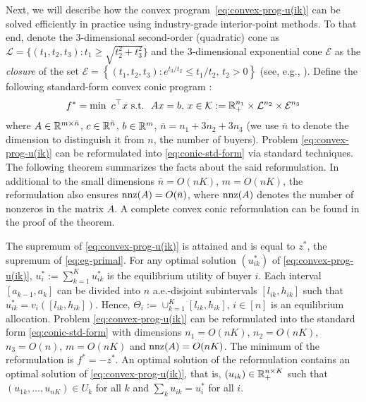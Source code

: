 Next, we will describe how the convex program~\ref{eq:convex-prog-u(ik)} can be solved efficiently in practice using industry-grade interior-point methods.
To that end, denote the $3$-dimensional second-order (quadratic) cone as $\mathcal{L} = \{ (t_1, t_2, t_3): t_1 \geq \sqrt{t_2^2+t_3^2} \}$ and the $3$-dimensional exponential cone $\mathcal{E}$ as the \textit{closure} of the set $\mathcal{E}  = \left\{ (t_1, t_2, t_3): e^{t_3/t_2} \leq t_1/t_2,\, t_2 >0 \right\}$ (see, e.g., \cite{chares2009cones}).
Define the following standard-form convex conic program \citep{skajaa2015homogeneous,dahl2019primal,nemirovski2004interior}:
\begin{align}
	\begin{split}
		f^* = \min\ c^\top x \ {\rm s.t.}\  \ Ax = b,\,  x\in \mathcal{K}:= \mathbb{R}_+^{n_1} \times \mathcal{L}^{n_2} \times \mathcal{E}^{n_3}
	\end{split} \label{eq:conic-std-form}
\end{align}
where $A\in \mathbb{R}^{m\times \bar{n}}$, $c\in \mathbb{R}^{\bar{n}}$, $b\in \mathbb{R}^m$, $\bar{n} = n_1 + 3n_2 + 3n_3$ (we use $\bar{n}$ to denote the dimension to distinguish it from $n$, the number of buyers). 
Problem \eqref{eq:convex-prog-u(ik)} can be reformulated into \eqref{eq:conic-std-form} via standard techniques. 
The following theorem summarizes the facts about the said reformulation. 
In additional to the small dimensions $\bar{n} = O(nK)$, $m=O(nK)$, the reformulation also ensures ${\rm nnz}(A) = O(\bar{n})$, where ${\rm nnz}(A)$ denotes the number of nonzeros in the matrix $A$. A complete convex conic reformulation can be found in the proof of the theorem.
\begin{theorem}
	The supremum of \eqref{eq:convex-prog-u(ik)} is attained and is equal to $z^*$, the supremum of \eqref{eq:eg-primal}.
	For any optimal solution $(u^*_{ik})$ of \eqref{eq:convex-prog-u(ik)}, $u^*_i := \sum_{k=1}^K u^*_{ik}$ is the equilibrium utility of buyer $i$. 
	Each interval $[a_{k-1}, a_k]$ can be divided into $n$ a.e.-disjoint subintervals $[l_{ik}, h_{ik}]$ such that $u^*_{ik} = v_i([l_{ik}, h_{ik}])$. Hence, $\Theta_i := \cup_{k=1}^K [l_{ik}, h_{ik}]$, $i\in[n]$ is an equilibrium allocation. 
	Problem \eqref{eq:convex-prog-u(ik)} can be reformulated into the standard form \eqref{eq:conic-std-form} with dimensions $n_1 = O(nK)$, $n_2 = O(nK)$, $n_3 = O(n)$, $m = O(nK)$ and ${\rm nnz}(A) = O(nK)$. The minimum of the reformulation is $f^* = -z^*$.
	An optimal solution of the reformulation contains an optimal solution of \eqref{eq:convex-prog-u(ik)}, that is, $(u_{ik})\in \mathbb{R}_+^{n\times K}$ such that $(u_{1k}, \dots, u_{nK})\in U_k$ for all $k$ and $\sum_k u_{ik} = u^*_i$ for all $i$.
 	 \label{lemma:eg=>u(ik)-facts}
\end{theorem}

